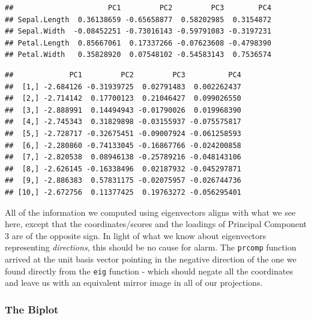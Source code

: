 \documentclass[
]{article}
\newenvironment{Shaded}{\begin{snugshade}}{\end{snugshade}}
\newcommand{\CommentTok}[1]{\textcolor[rgb]{0.56,0.35,0.01}{\textit{#1}}}
\newcommand{\DecValTok}[1]{\textcolor[rgb]{0.00,0.00,0.81}{#1}}
\newcommand{\NormalTok}[1]{#1}
\newcommand{\SpecialCharTok}[1]{\textcolor[rgb]{0.00,0.00,0.00}{#1}}
\theoremstyle{definition}
\theoremstyle{definition}
\theoremstyle{definition}
\theoremstyle{definition}
\theoremstyle{remark}
\begin{document}
\begin{verbatim}
##                      PC1         PC2         PC3        PC4
## Sepal.Length  0.36138659 -0.65658877  0.58202985  0.3154872
## Sepal.Width  -0.08452251 -0.73016143 -0.59791083 -0.3197231
## Petal.Length  0.85667061  0.17337266 -0.07623608 -0.4798390
## Petal.Width   0.35828920  0.07548102 -0.54583143  0.7536574
\end{verbatim}

\begin{Shaded}
\end{Shaded}

\begin{verbatim}
##             PC1         PC2         PC3          PC4
##  [1,] -2.684126 -0.31939725  0.02791483  0.002262437
##  [2,] -2.714142  0.17700123  0.21046427  0.099026550
##  [3,] -2.888991  0.14494943 -0.01790026  0.019968390
##  [4,] -2.745343  0.31829898 -0.03155937 -0.075575817
##  [5,] -2.728717 -0.32675451 -0.09007924 -0.061258593
##  [6,] -2.280860 -0.74133045 -0.16867766 -0.024200858
##  [7,] -2.820538  0.08946138 -0.25789216 -0.048143106
##  [8,] -2.626145 -0.16338496  0.02187932 -0.045297871
##  [9,] -2.886383  0.57831175 -0.02075957 -0.026744736
## [10,] -2.672756  0.11377425  0.19763272 -0.056295401
\end{verbatim}

All of the information we computed using eigenvectors aligns with what we see here, except that the coordinates/scores and the loadings of Principal Component 3 are of the opposite sign. In light of what we know about eigenvectors representing \emph{directions}, this should be no cause for alarm. The \texttt{prcomp} function arrived at the unit basis vector pointing in the negative direction of the one we found directly from the \texttt{eig} function - which should negate all the coordinates and leave us with an equivalent mirror image in all of our projections.

\hypertarget{the-biplot}{%
\subsubsection{The Biplot}\label{the-biplot}}
\end{document}
